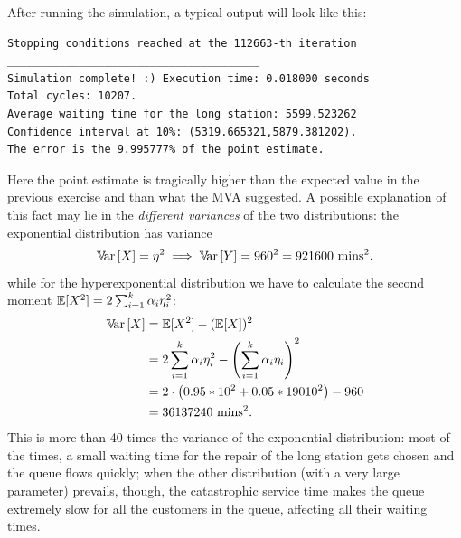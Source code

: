 \documentclass[12pt]{article}
\begin{document}
After running the simulation, a typical output will look like this:
\begin{verbatim}
Stopping conditions reached at the 112663-th iteration
_______________________________________
Simulation complete! :) Execution time: 0.018000 seconds
Total cycles: 10207.
Average waiting time for the long station: 5599.523262
Confidence interval at 10%: (5319.665321,5879.381202).
The error is the 9.995777% of the point estimate.
\end{verbatim}
Here the point estimate is tragically higher than the expected value in the previous exercise and than what the MVA suggested. A possible explanation of this fact may lie in the \emph{different variances} of the two distributions: the exponential distribution has variance
\begin{equation*}
	\mathbb{V}\!\mathrm{ar}\,[X]=\eta^{2}\implies\mathbb{V}\!\mathrm{ar}\,[Y]=960^{2}=921600\text{ mins}^2.
\end{equation*}
while for the hyperexponential distribution we have to calculate the second moment $\mathbb{E}[X^{2}]=2\sum_{i=1}^{k}\alpha_{i}\eta_i^2$:
\begin{align*}
	\mathbb{V}\!\mathrm{ar}\,[X]&=\mathbb{E}[X^{2}]-(\mathbb{E}[X])^{2}\\
	&=2\sum_{i=1}^{k}\alpha_{i}\eta_i^2-\left(\sum_{i=1}^{k}\alpha_i\eta_i\right)^{2}\\
	&=2\cdot\left(0.95*10^{2}+0.05*19010^2\right)-960\\
	&=36137240\text{ mins}^2.
\end{align*}
This is more than 40 times the variance of the exponential distribution: most of the times, a small waiting time for the repair of the long station gets chosen and the queue flows quickly; when the other distribution (with a very large parameter) prevails, though, the catastrophic service time makes the queue extremely slow for all the customers in the queue, affecting all their waiting times.
\end{document}

